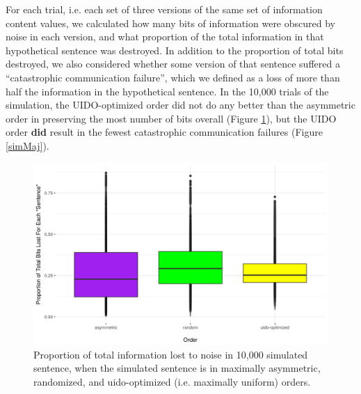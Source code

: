 \documentclass[12pt]{article}
\begin{document}
For each trial, i.e. each set of three versions of the same set of information content values, we calculated how many bits of information were obscured by noise in each version, and what proportion of the total information in that hypothetical sentence was destroyed.  In addition to the proportion of total bits destroyed, we also considered whether some version of that sentence suffered a ``catastrophic communication failure'', which we defined as a loss of more than half the information in the hypothetical sentence. In the 10,000 trials of the simulation, the UIDO-optimized order did not do any better than the asymmetric order in preserving the most number of bits overall (Figure \ref{simBits}), but the UIDO order \textbf{did} result in the fewest catastrophic communication failures (Figure \ref{simMaj}).

\begin{figure}
	\begin{center}
\includegraphics[width=.95\textwidth]{uid-sim-totalbits.png}
\caption{Proportion of total information lost to noise in 10,000 simulated sentence, when the simulated sentence is in maximally asymmetric, randomized, and uido-optimized (i.e. maximally uniform) orders.}
\label{simBits}
\end{center}
\end{figure}
\end{document}

